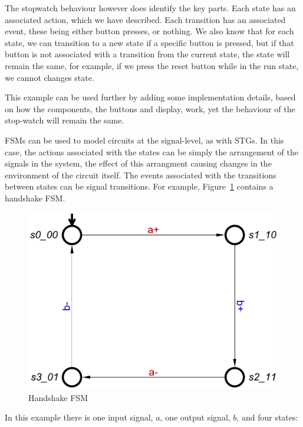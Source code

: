 The stopwatch behaviour however does identify the key parts. Each state has an associated action, which we have described. Each transition
has an associated event, these being either button presses, or nothing. We also know that for each state, we can transition to a new state if a
specific button is pressed, but if that button is not associated with a transition from the current state, the state will remain the same, for example, 
if we press the reset button while in the run state, we cannot changes state. 

This example can be used further by adding some implementation details, based on how the components, the buttons and display, work, yet 
the behaviour of the stop-watch will remain the same. 

FSMs can be used to model circuits at the signal-level, as with STGs. In this case, the actions associated with the states can be simply the
arrangement of the signals in the system, the effect of this arrangment causing changes in the environment of the circuit itself. The events 
associated with the transitions between states can be signal transitions. For example, Figure~\ref{fig:handshake-fsm} contains a handshake FSM.

\begin{figure}[h]
\begin{centering}
\includegraphics[scale=0.5]{images/handshake-fsm}
\par\end{centering}
\protect\caption{\label{fig:handshake-fsm} Handshake FSM}
\end{figure}

In this example there is one input signal, $a$, one output signal, $b$, and four states: 

